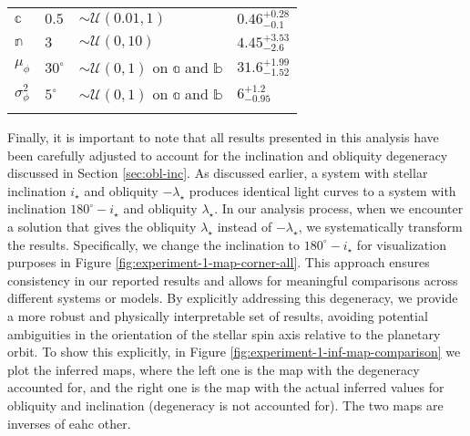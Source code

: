 \documentclass[twocolumn]{aastex631}
\begin{document}
\begin{table}[]
\begin{tabular}{llll}
    $\mathbb{c}$                              & $0.5$                 & $\sim\mathcal{U}(0.01, 1)$           & $0.46^{+0.28}_{-0.1}$                               \\
    $\mathbb{n}$                              & $3$                   & $\sim\mathcal{U}(0, 10)$             & $4.45^{+3.53}_{-2.6}$                               \\
    $\mu_\phi$                                & $30^\circ$            & $\sim\mathcal{U}(0, 1)$ on $\mathbb{a}$ and $\mathbb{b}$ & $31.6^{+1.99}_{-1.52}$                               \\
    $\sigma^2_\phi$                           & $5^\circ$             & $\sim\mathcal{U}(0, 1)$ on $\mathbb{a}$ and $\mathbb{b}$ & $6^{+1.2}_{-0.95}$                      \\ \hline
    \label{tab:LongPriors}
    \end{tabular}
\end{table}
%

Finally, it is important to note that all results presented in this analysis have been carefully adjusted to account for the inclination and obliquity 
degeneracy discussed in Section \ref{sec:obl-inc}. As discussed earlier, a system with stellar inclination $i_\star$ and obliquity $-\lambda_\star$ 
produces identical light curves to a system with inclination $180^\circ-i_\star$ and obliquity $\lambda_\star$. In our analysis process, 
when we encounter a solution that gives the obliquity $\lambda_\star$ instead of $-\lambda_\star$, we systematically transform the results. 
Specifically, we change the inclination to $180^\circ-i_\star$ for visualization purposes in Figure \ref{fig:experiment-1-map-corner-all}. 
This approach ensures consistency in our reported results and allows for meaningful comparisons across different systems or models. 
By explicitly addressing this degeneracy, we provide a more robust and physically interpretable set of results, avoiding potential ambiguities in the 
orientation of the stellar spin axis relative to the planetary orbit. To show this explicitly, in Figure \ref{fig:experiment-1-inf-map-comparison}
we plot the inferred maps, where the left one is the map with the degeneracy accounted for, and the right one is the map with the actual inferred values 
for obliquity and inclination (degeneracy is not accounted for). The two maps are inverses of eahc other.
\end{document}
